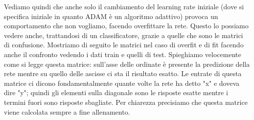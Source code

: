 \documentclass[10pt,a4paper]{article}
\begin{document}
Vediamo quindi che anche solo il cambiamento del learning rate iniziale (dove si specifica iniziale in quanto ADAM è un algoritmo adattivo) provoca un comportamento che non vogliamo, facendo overfittare la rete. Questo lo possiamo vedere anche, trattandosi di un classificatore, grazie a quelle che sono le matrici di confusione. Mostriamo di seguito le matrici nel caso di overfit e di fit facendo anche il confronto vedendo i dati train e quelli di test. Spieghiamo velocemente come si legge questa matrice: sull'asse delle ordinate è presente la predizione della rete mentre su quello delle ascisse ci sta il risultato esatto. Le entrate di questa matrice ci dicono fondamentalmente quante volte la rete ha detto "x" e doveva dire "y"; quindi gli elementi sulla diagonale sono le risposte esatte mentre i termini fuori sono risposte sbagliate. Per chiarezza precisiamo che questa matrice viene calcolata sempre a fine allenamento.
\FloatBarrier
\end{document}
